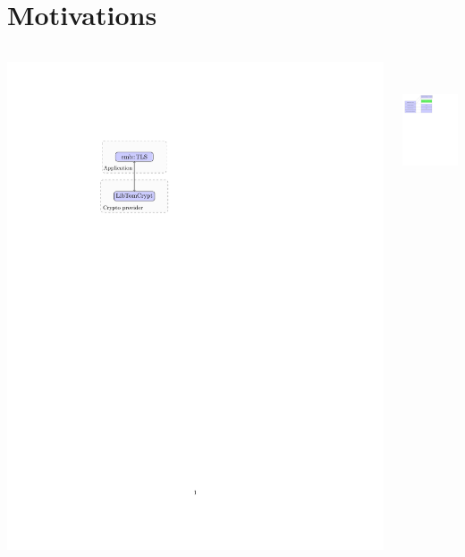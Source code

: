 
\section{Motivations}
\begin{frame}

\begin{columns}[t]

\begin{column}{0.375\textwidth}

\vspace{1cm}

\includegraphics[trim=5cm 5cm 14cm 4.25cm]{figures/intro_cw.pdf}

\end{column}

\begin{column}{0.625\textwidth}

\includegraphics[trim=0cm 20cm 15cm 0cm, height=4cm]{figures/tls_osi.pdf}


\end{column}
\end{columns}
\end{frame}
